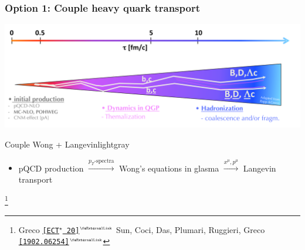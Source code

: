 \documentclass[aspectratio=169,11pt,usenames,dvipsnames]{beamer}
\renewcommand{\thefootnote}{\color{customblue}\faPaperPlaneO}
\newcommand\blfootnote[1]{%
  \begingroup
  \renewcommand\thefootnote{}\footnote{#1}%
  \addtocounter{footnote}{-1}%
  \endgroup
}
\begin{document}
\begin{frame}
    \frametitle{{\normalsize\color{jyured}\bfseries\sffamily Option 1: }Couple heavy quark transport}
    \vspace{-10pt}
    \begin{center}
        \includegraphics[width=0.7\paperwidth]{images/Greco-HF-Theory-HP2020-v-5_edit.png}
    \end{center}

   \begin{center}
    \begin{custombox2}{Couple Wong + Langevin}{lightgray}
        \small
        \begin{varwidth}{0.89\textwidth}
        \begin{itemize}\itemsep0em 
            \item pQCD production $\xrightarrow{p_T\text{-spectra}}$ Wong's equations in glasma $\xrightarrow{x^\mu, p^\mu}$ Langevin transport
        \end{itemize}
        \end{varwidth}
    \end{custombox2}

   \end{center} 
    \blfootnote{\scriptsize Greco \href{https://indico.ectstar.eu/event/40/contributions/1055/attachments/745/968/Greco-transport-ECT.pdf}{{\color{jyured}\texttt{[ECT$^\star$ 20]}$^\text{\tiny\faExternalLink}$}} Sun, Coci, Das, Plumari, Ruggieri, Greco \href{https://arxiv.org/abs/1902.06254}{{\color{jyured}\texttt{[1902.06254]$^\text{\tiny\faExternalLink}$}}}}
\end{frame}


\end{document}
